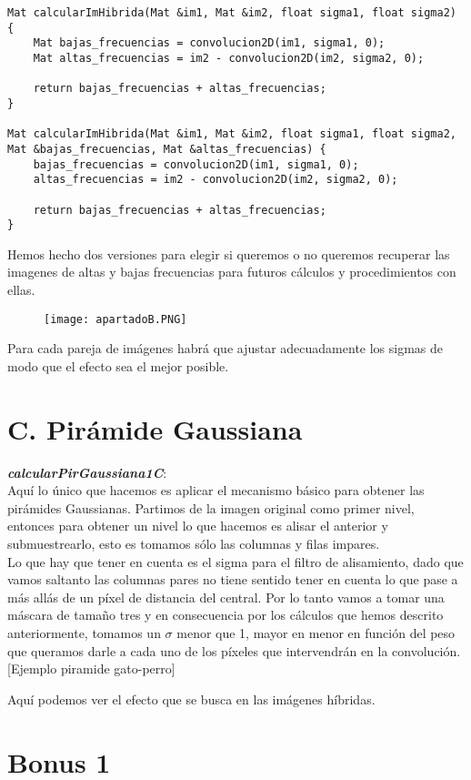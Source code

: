 \documentclass[10pt,a4paper]{article}
\begin{document}
\begin{lstlisting}
Mat calcularImHibrida(Mat &im1, Mat &im2, float sigma1, float sigma2) {
	Mat bajas_frecuencias = convolucion2D(im1, sigma1, 0);
	Mat altas_frecuencias = im2 - convolucion2D(im2, sigma2, 0);

	return bajas_frecuencias + altas_frecuencias;
}

Mat calcularImHibrida(Mat &im1, Mat &im2, float sigma1, float sigma2, Mat &bajas_frecuencias, Mat &altas_frecuencias) {
	bajas_frecuencias = convolucion2D(im1, sigma1, 0);
	altas_frecuencias = im2 - convolucion2D(im2, sigma2, 0);

	return bajas_frecuencias + altas_frecuencias;
}
\end{lstlisting}

Hemos hecho dos versiones para elegir si queremos o no queremos recuperar las imagenes de altas y bajas frecuencias para futuros cálculos y procedimientos con ellas.\\

\begin{figure}[H]
\centering
\texttt{[image: apartadoB.PNG]}
\end{figure}

Para cada pareja de imágenes habrá que ajustar adecuadamente los sigmas de modo que el efecto sea el mejor posible.\\

\section*{C. Pirámide Gaussiana}



\textbf{\textit{calcularPirGaussiana1C}}:\\

Aquí lo único que hacemos es aplicar el mecanismo básico para obtener las pirámides Gaussianas. Partimos de la imagen original como primer nivel, entonces para obtener un nivel lo que hacemos es alisar el anterior y submuestrearlo, esto es tomamos sólo las columnas y filas impares.\\

Lo que hay que tener en cuenta es el sigma para el filtro de alisamiento, dado que vamos saltanto las columnas pares no tiene sentido tener en cuenta lo que pase a más allás de un píxel de distancia del central. Por lo tanto vamos a tomar una máscara de tamaño tres y en consecuencia por los cálculos que hemos descrito anteriormente, tomamos un $\sigma$ menor que 1, mayor en menor en función del peso que queramos darle a cada uno de los píxeles que intervendrán en la convolución.\\

[Ejemplo piramide gato-perro]

Aquí podemos ver el efecto que se busca en las imágenes híbridas.\\

\section*{Bonus 1}
\end{document}
